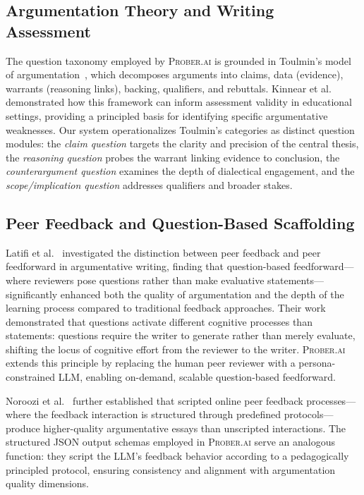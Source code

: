 \documentclass[11pt,a4paper]{article}
\begin{document}
\subsection{Argumentation Theory and Writing Assessment}

The question taxonomy employed by \textsc{Prober.ai} is grounded in Toulmin's model of argumentation~\cite{kinnear2022argumentation}, which decomposes arguments into claims, data (evidence), warrants (reasoning links), backing, qualifiers, and rebuttals. Kinnear et al.~\cite{kinnear2022argumentation} demonstrated how this framework can inform assessment validity in educational settings, providing a principled basis for identifying specific argumentative weaknesses. Our system operationalizes Toulmin's categories as distinct question modules: the \textit{claim question} targets the clarity and precision of the central thesis, the \textit{reasoning question} probes the warrant linking evidence to conclusion, the \textit{counterargument question} examines the depth of dialectical engagement, and the \textit{scope/implication question} addresses qualifiers and broader stakes.

\subsection{Peer Feedback and Question-Based Scaffolding}

Latifi et al.~\cite{latifi2021peer} investigated the distinction between peer feedback and peer feedforward in argumentative writing, finding that question-based feedforward---where reviewers pose questions rather than make evaluative statements---significantly enhanced both the quality of argumentation and the depth of the learning process compared to traditional feedback approaches. Their work demonstrated that questions activate different cognitive processes than statements: questions require the writer to generate rather than merely evaluate, shifting the locus of cognitive effort from the reviewer to the writer. \textsc{Prober.ai} extends this principle by replacing the human peer reviewer with a persona-constrained LLM, enabling on-demand, scalable question-based feedforward.

Noroozi et al.~\cite{noroozi2016relations} further established that scripted online peer feedback processes---where the feedback interaction is structured through predefined protocols---produce higher-quality argumentative essays than unscripted interactions. The structured JSON output schemas employed in \textsc{Prober.ai} serve an analogous function: they script the LLM's feedback behavior according to a pedagogically principled protocol, ensuring consistency and alignment with argumentation quality dimensions.
\end{document}
